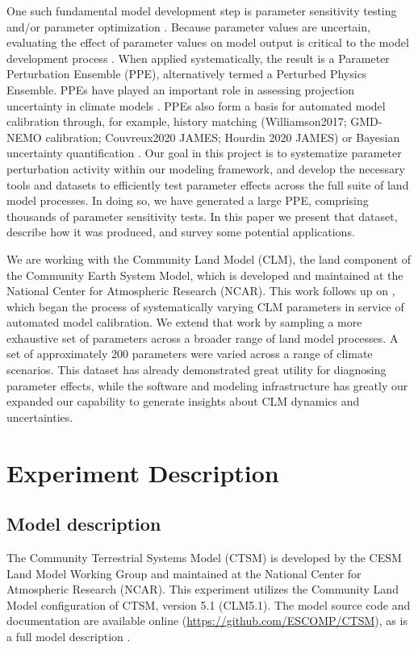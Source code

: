 \documentclass[draft]{agujournal2019}
\begin{document}
One such fundamental model development step is parameter sensitivity testing and/or parameter optimization \cite{qian2018}.
Because parameter values are uncertain, evaluating the effect of parameter values on model output is critical to the model development process \cite{hourdin2017,balaji2022}.
When applied systematically, the result is a Parameter Perturbation Ensemble (PPE), alternatively termed a Perturbed Physics Ensemble.
PPEs have played an important role in assessing projection uncertainty in climate models \cite{murphy2004,sanderson2008,booth2012,hawkins2019,yamazaki2021,peatier2022,tett2022}.
PPEs also form a basis for automated model calibration through, for example, history matching \cite{williamson2013} (Williamson2017; GMD-NEMO calibration; Couvreux2020 JAMES; Hourdin 2020 JAMES) or Bayesian uncertainty quantification \cite{cleary2021}.
Our goal in this project is to systematize parameter perturbation activity within our modeling framework, and develop the necessary tools and datasets to efficiently test parameter effects across the full suite of land model processes. 
In doing so, we have generated a large PPE, comprising thousands of parameter sensitivity tests.
In this paper we present that dataset, describe how it was produced, and survey some potential applications.

We are working with the Community Land Model (CLM), the land component of the Community Earth System Model, which is developed and maintained at the National Center for Atmospheric Research (NCAR).
This work follows up on , which began the process of systematically varying CLM parameters in service of automated model calibration.
We extend that work by sampling a more exhaustive set of parameters across a broader range of land model processes.
A set of approximately 200 parameters were varied across a range of climate scenarios.
This dataset has already demonstrated great utility for diagnosing parameter effects, while the software and modeling infrastructure has greatly our expanded our capability to generate insights about CLM dynamics and uncertainties.

\section{Experiment Description}
\label{methods}
\subsection{Model description}
\label{sect:md}
The Community Terrestrial Systems Model (CTSM) is developed by the CESM Land Model Working Group and maintained at the National Center for Atmospheric Research (NCAR). This experiment utilizes the Community Land Model configuration of CTSM, version 5.1 (CLM5.1). The model source code and documentation are available online (\url{https://github.com/ESCOMP/CTSM}), as is a full model description \cite{lawrence2019}.
\end{document}
